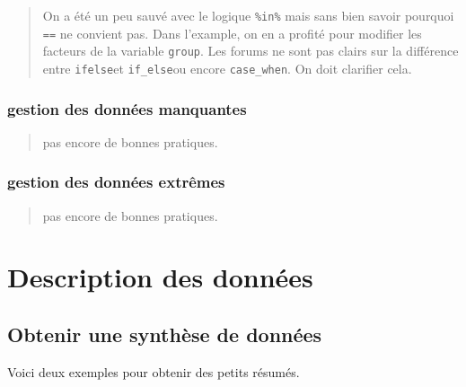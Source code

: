 \documentclass[
  letterpaper,
  DIV=11,
  numbers=noendperiod]{scrreprt}
\begin{document}
\begin{quote}
On a été un peu sauvé avec le logique \texttt{\%in\%} mais sans bien
savoir pourquoi \texttt{==} ne convient pas. Dans l'example, on en a
profité pour modifier les facteurs de la variable \texttt{group}. Les
forums ne sont pas clairs sur la différence entre \texttt{ifelse}et
\texttt{if\_else}ou encore \texttt{case\_when}. On doit clarifier cela.
\end{quote}

\hypertarget{gestion-des-donnuxe9es-manquantes}{%
\subsection{gestion des données
manquantes}\label{gestion-des-donnuxe9es-manquantes}}

\begin{quote}
pas encore de bonnes pratiques.
\end{quote}

\hypertarget{gestion-des-donnuxe9es-extruxeames}{%
\subsection{gestion des données
extrêmes}\label{gestion-des-donnuxe9es-extruxeames}}

\begin{quote}
pas encore de bonnes pratiques.
\end{quote}


\hypertarget{description-des-donnuxe9es}{%
\chapter{Description des données}\label{description-des-donnuxe9es}}

\hypertarget{obtenir-une-synthuxe8se-de-donnuxe9es}{%
\section{Obtenir une synthèse de
données}\label{obtenir-une-synthuxe8se-de-donnuxe9es}}

Voici deux exemples pour obtenir des petits résumés.
\end{document}

